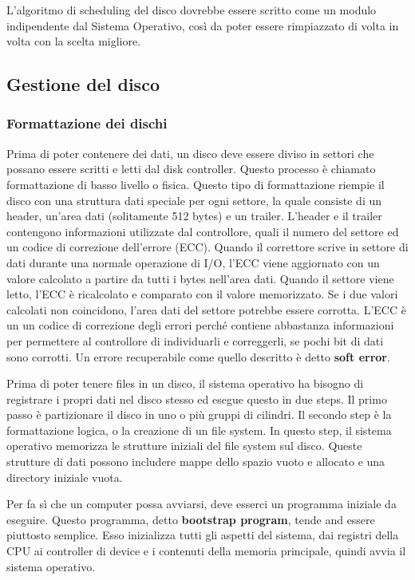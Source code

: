 \documentclass[a4]{article}
\begin{document}
L'algoritmo di scheduling del disco dovrebbe essere scritto come un modulo indipendente dal Sistema Operativo, così da poter essere rimpiazzato di volta in volta con la scelta migliore.

\subsection{Gestione del disco}

\subsubsection{Formattazione dei dischi}
Prima di poter contenere dei dati, un disco deve essere diviso in settori che possano essere scritti e letti dal disk controller. Questo processo è chiamato formattazione di basso livello o fisica. Questo tipo di formattazione riempie il disco con una struttura dati speciale per ogni settore, la quale consiste di un header, un'area dati (solitamente 512 bytes) e un trailer. L'header e il trailer contengono informazioni utilizzate dal controllore, quali il numero del settore ed un codice di correzione dell'errore (ECC). Quando il correttore scrive in settore di dati durante una normale operazione di I/O, l'ECC viene aggiornato con un valore calcolato a partire da tutti i bytes nell'area dati. Quando il settore viene letto, l'ECC è ricalcolato e comparato con il valore memorizzato. Se i due valori calcolati non coincidono, l'area dati del settore potrebbe essere corrotta. L'ECC è un un codice di correzione degli errori perché contiene abbastanza informazioni per permettere al controllore di individuarli e correggerli, se pochi bit di dati sono corrotti. Un errore recuperabile come quello descritto è detto \textbf{soft error}.

Prima di poter tenere files in un disco, il sistema operativo ha bisogno di registrare i propri dati nel disco stesso ed esegue questo in due steps. Il primo passo è partizionare il disco in uno o più gruppi di cilindri. Il secondo step è la formattazione logica, o la creazione di un file system. In questo step, il sistema operativo memorizza le strutture iniziali del file system sul disco. Queste strutture di dati possono includere mappe dello spazio vuoto e allocato e una directory iniziale vuota.

Per fa sì che un computer possa avviarsi, deve esserci un programma iniziale da eseguire. Questo programma, detto \textbf{bootstrap program}, tende and essere piuttosto semplice. Esso inizializza tutti gli aspetti del sistema, dai registri della CPU ai controller di device e i contenuti della memoria principale, quindi avvia il sistema operativo.
\end{document}
